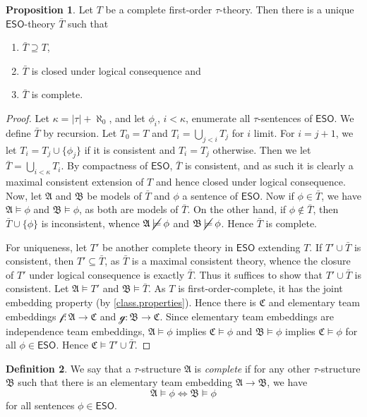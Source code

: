 \documentclass[a4paper]{amsart}
\theoremstyle{definition}
\newtheorem{definition}{Definition}[section]
\newtheorem{proposition}[definition]{Proposition}
\theoremstyle{remark}
\newcommand{\A}{\mathcal{A}}
\newcommand{\B}{\mathcal{B}}
\newcommand{\C}{\mathcal{C}}
\newcommand\eso{\mathsf{ESO}}
\newcommand\nmodels{\mathbin{\cancel{\models}}}
\theoremstyle{definition}
\renewcommand{\A}{\mathfrak{A}}
\renewcommand{\B}{\mathfrak{B}}
\renewcommand{\C}{\mathfrak{C}}
\newcommand{\f}{\mathcal{f}}
\newcommand{\g}{\mathcal{g}}
\begin{document}
\begin{proposition}\label{prop:unique_eso_completion}
    Let $T$ be a complete first-order $\tau$-theory. Then there is a unique $\eso$-theory $\bar T$ such that
    \begin{enumerate}
        \item $\bar T\supseteq T$,
        \item $\bar T$ is closed under logical consequence and
        \item $\bar T$ is complete.
    \end{enumerate}
\end{proposition}
\begin{proof}
    Let $\kappa = |\tau|+\aleph_0$, and let $\phi_i$, $i<\kappa$, enumerate all $\tau$-sentences of $\eso$. We define $\bar T$ by recursion. Let $T_0 = T$ and $T_i = \bigcup_{j<i}T_j$ for $i$ limit. For $i = j+1$, we let $T_i = T_j\cup\{\phi_j\}$ if it is consistent and $T_i = T_j$ otherwise. Then we let $\bar T = \bigcup_{i<\kappa}T_i$. By compactness of $\eso$, $\bar T$ is consistent, and as such it is clearly a maximal consistent extension of $T$ and hence closed under logical consequence. Now, let $\A$ and $\B$ be models of $\bar T$ and $\phi$ a sentence of $\eso$. Now if $\phi\in\bar T$, we have $\A\models\phi$ and $\B\models\phi$, as both are models of $\bar T$. On the other hand, if $\phi\notin\bar T$, then $\bar T\cup\{\phi\}$ is inconsistent, whence $\A\nmodels\phi$ and $\B\nmodels\phi$. Hence $\bar T$ is complete.
    
    For uniqueness, let $T'$ be another complete theory in $\eso$ extending $T$. If $T'\cup\bar T$ is consistent, then $T'\subseteq\bar T$, as $\bar T$ is a maximal consistent theory, whence the closure of $T'$ under logical consequence is exactly $\bar T$. Thus it suffices to show that $T'\cup\bar T$ is consistent. Let $\A\models T'$ and $\B\models\bar T$. As $T$ is first-order-complete, it has the joint embedding property (by \cref{class.properties}). Hence there is $\C$ and elementary team embeddings $\f\colon\A\to\C$ and $\g\colon\B\to\C$. Since elementary team embeddings are independence team embeddings, $\A\models\phi$ implies $\C\models\phi$ and $\B\models\phi$ implies $\C\models\phi$ for all $\phi\in\eso$. Hence $\C\models T'\cup\bar T$.
\end{proof}

\begin{definition}
    We say that a $\tau$-structure $\A$ is \emph{complete} if for any other $\tau$-structure $\B$ such that there is an elementary team embedding $\A\to\B$, we have
    \[
        \A\models\phi \iff \B\models\phi
    \]
    for all sentences $\phi\in\eso$. 
\end{definition}
\end{document}
